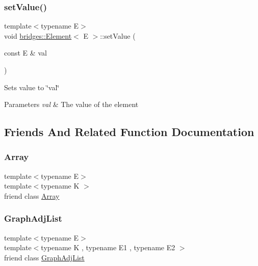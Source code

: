 \subsubsection{\texorpdfstring{set\+Value()}{setValue()}}
{\footnotesize\ttfamily template$<$typename E$>$ \\
void \mbox{\hyperlink{classbridges_1_1_element}{bridges\+::\+Element}}$<$ E $>$\+::set\+Value (\begin{DoxyParamCaption}\item[{const E \&}]{val }\end{DoxyParamCaption})\hspace{0.3cm}{\ttfamily [inline]}}

Sets value to \char`\"{}val\char`\"{}


\begin{DoxyParams}{Parameters}
{\em val} & The value of the element \\
\hline
\end{DoxyParams}


\subsection{Friends And Related Function Documentation}
\mbox{\label{classbridges_1_1_element_ab1a595168ea1870ce436dfd2d8e69b6d}} 
\subsubsection{\texorpdfstring{Array}{Array}}
{\footnotesize\ttfamily template$<$typename E$>$ \\
template$<$typename K $>$ \\
friend class \mbox{\hyperlink{classbridges_1_1_array}{Array}}\hspace{0.3cm}{\ttfamily [friend]}}

\mbox{\label{classbridges_1_1_element_a65850138f0763fec43a76fb942f0eccc}} 
\subsubsection{\texorpdfstring{Graph\+Adj\+List}{GraphAdjList}}
{\footnotesize\ttfamily template$<$typename E$>$ \\
template$<$typename K , typename E1 , typename E2 $>$ \\
friend class \mbox{\hyperlink{classbridges_1_1_graph_adj_list}{Graph\+Adj\+List}}\hspace{0.3cm}{\ttfamily [friend]}}

